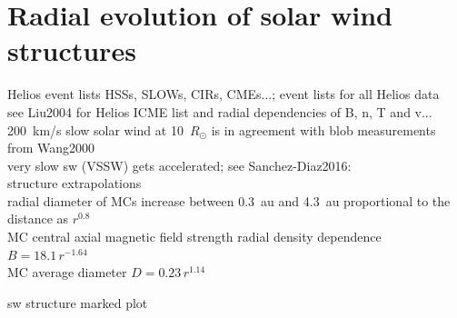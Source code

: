 \section{Radial evolution of solar wind structures}

Helios event lists HSSs, SLOWs, CIRs, CMEs...; event lists for all Helios data\\
see Liu2004 for Helios ICME list and radial dependencies of B, n, T and v...\\

200~km/s slow solar wind at 10~$R_\odot$ is in agreement with blob measurements from Wang2000\\

very slow sw (VSSW) gets accelerated; see Sanchez-Diaz2016:\\

structure extrapolations\\

radial diameter of MCs increase between 0.3~au and 4.3~au proportional to the distance as $r^{0.8}$ \citep{Bothmer1998}\\

MC central axial magnetic field strength radial density dependence $B = 18.1\,r^{-1.64}$ \citet{Leitner2007}\\
MC average diameter $D = 0.23\,r^{1.14}$ \citet{Leitner2007}

sw structure marked plot\\


